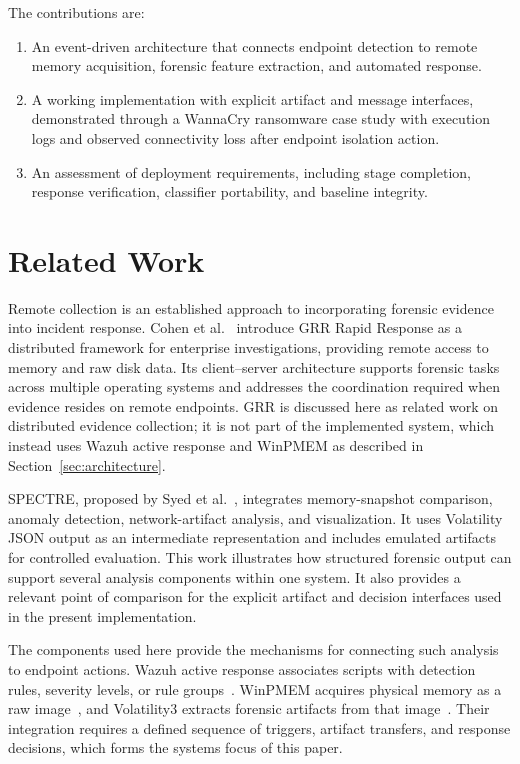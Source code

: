 \documentclass[conference]{IEEEtran}
\begin{document}
The contributions are:
\begin{enumerate}
\item An event-driven architecture that connects endpoint detection to remote memory acquisition, forensic feature extraction, and automated response. 
\item A working implementation with explicit artifact and message interfaces, demonstrated through a WannaCry ransomware case study with execution logs and observed connectivity loss after endpoint isolation action.
\item An assessment of deployment requirements, including stage completion, response verification, classifier portability, and baseline integrity.
\end{enumerate}

\section{Related Work}

Remote collection is an established approach to incorporating forensic
evidence into incident response. Cohen et al.~\cite{cohen2011} introduce
GRR Rapid Response as a distributed framework for enterprise investigations,
providing remote access to memory and raw disk data. Its client--server
architecture supports forensic tasks across multiple operating systems and
addresses the coordination required when evidence resides on remote endpoints.
GRR is discussed here as related work on distributed evidence collection; it
is not part of the implemented system, which instead uses Wazuh active
response and WinPMEM as described in Section~\ref{sec:architecture}.

SPECTRE, proposed by Syed et al.~\cite{syed2026}, integrates memory-snapshot
comparison, anomaly detection, network-artifact analysis, and visualization.
It uses Volatility JSON output as an intermediate representation and includes
emulated artifacts for controlled evaluation. This work illustrates how
structured forensic output can support several analysis components within
one system. It also provides a relevant point of comparison for the explicit
artifact and decision interfaces used in the present implementation.

The components used here provide the mechanisms for connecting such analysis
to endpoint actions. Wazuh active response associates scripts with detection
rules, severity levels, or rule groups~\cite{wazuh}. WinPMEM acquires physical
memory as a raw image~\cite{winpmem}, and Volatility3 extracts forensic
artifacts from that image~\cite{volatility}. Their integration requires a
defined sequence of triggers, artifact transfers, and response decisions,
which forms the systems focus of this paper.
\end{document}

